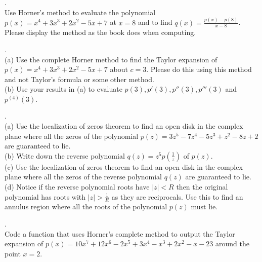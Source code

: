\documentclass[12 pt]{article}
\begin{document}
\medskip

. \\
Use Horner's method to evaluate the polynomial $p(x)=x^4 + 3x^3 + 2x^2 -5x + 7$ at $x=8$ and to find 
$q(x)=\frac{p(x)-p(8)}{x-8}$. Please display the method as the book does when computing. 


\medskip

. \\
(a) Use the complete Horner method to find the Taylor expansion of $p(x)=x^4+3x^3+2x^2-5x+7$ about $c=3$. 
Please do this using this method and not Taylor's formula or some other method. \\
(b) Use your results in (a) to evaluate $p(3), p'(3), p''(3), p'''(3)$ and $p^{(4)}(3)$.

\medskip

. \\
(a) Use the localization of zeros theorem to find an open disk in the complex plane where all the zeros of the 
polynomial $p(z)=3z^5-7z^4-5z^3+z^2-8z+2$ are guaranteed to lie. \\
(b) Write down the reverse polynomial $q(z)=z^5p(\frac{1}{z})$ of $p(z)$. \\
(c) Use the localization of zeros theorem to find an open disk in the complex plane where all the zeros of the 
reverse polynomial $q(z)$ are guaranteed to lie. \\
(d) Notice if the reverse polynomial roots have $|z| < R$ then the original polynomial has roots with $|z| > \frac{1}{R}$ as 
they are reciprocals. 
Use this to find an annulus region where all the roots of the polynomial $p(z)$ must lie. 

\medskip

\medskip

. \\
Code a function that uses Horner's complete method to output the Taylor
expansion of $p(x)=10x^7+12x^6 - 2x^5 +3x^4-x^3+2x^2 -x - 23$ around the
point $x=2$. 
\end{document}
